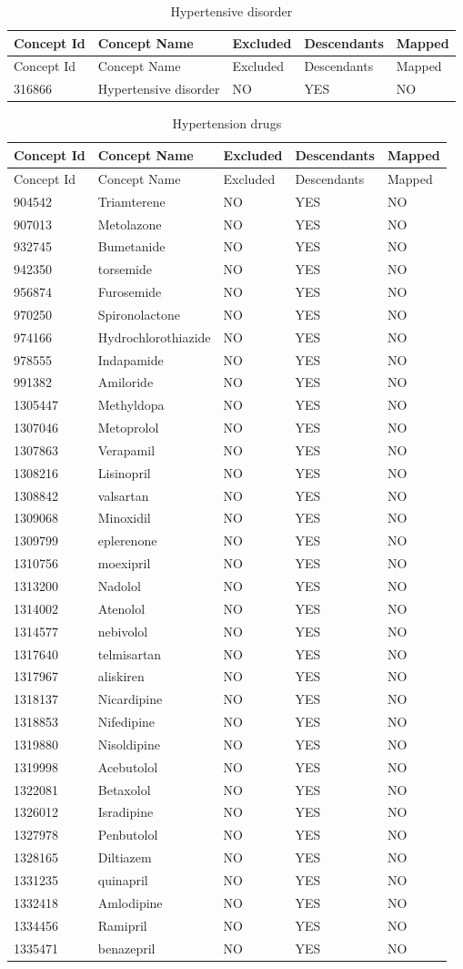 \documentclass[11pt]{book}
\theoremstyle{definition}
\theoremstyle{definition}
\theoremstyle{definition}
\theoremstyle{remark}
\begin{document}
\begin{longtable}[]{@{}lllll@{}}
\caption{\label{tab:hypertensionAceMono} Hypertensive
disorder}\tabularnewline
\toprule
Concept Id & Concept Name & Excluded & Descendants &
Mapped\tabularnewline
\midrule
\endfirsthead
\toprule
Concept Id & Concept Name & Excluded & Descendants &
Mapped\tabularnewline
\midrule
\endhead
316866 & Hypertensive disorder & NO & YES & NO\tabularnewline
\bottomrule
\end{longtable}

\begin{longtable}[]{@{}lllll@{}}
\caption{\label{tab:htnDrugsAceMono} Hypertension drugs}\tabularnewline
\toprule
Concept Id & Concept Name & Excluded & Descendants &
Mapped\tabularnewline
\midrule
\endfirsthead
\toprule
Concept Id & Concept Name & Excluded & Descendants &
Mapped\tabularnewline
\midrule
\endhead
904542 & Triamterene & NO & YES & NO\tabularnewline
907013 & Metolazone & NO & YES & NO\tabularnewline
932745 & Bumetanide & NO & YES & NO\tabularnewline
942350 & torsemide & NO & YES & NO\tabularnewline
956874 & Furosemide & NO & YES & NO\tabularnewline
970250 & Spironolactone & NO & YES & NO\tabularnewline
974166 & Hydrochlorothiazide & NO & YES & NO\tabularnewline
978555 & Indapamide & NO & YES & NO\tabularnewline
991382 & Amiloride & NO & YES & NO\tabularnewline
1305447 & Methyldopa & NO & YES & NO\tabularnewline
1307046 & Metoprolol & NO & YES & NO\tabularnewline
1307863 & Verapamil & NO & YES & NO\tabularnewline
1308216 & Lisinopril & NO & YES & NO\tabularnewline
1308842 & valsartan & NO & YES & NO\tabularnewline
1309068 & Minoxidil & NO & YES & NO\tabularnewline
1309799 & eplerenone & NO & YES & NO\tabularnewline
1310756 & moexipril & NO & YES & NO\tabularnewline
1313200 & Nadolol & NO & YES & NO\tabularnewline
1314002 & Atenolol & NO & YES & NO\tabularnewline
1314577 & nebivolol & NO & YES & NO\tabularnewline
1317640 & telmisartan & NO & YES & NO\tabularnewline
1317967 & aliskiren & NO & YES & NO\tabularnewline
1318137 & Nicardipine & NO & YES & NO\tabularnewline
1318853 & Nifedipine & NO & YES & NO\tabularnewline
1319880 & Nisoldipine & NO & YES & NO\tabularnewline
1319998 & Acebutolol & NO & YES & NO\tabularnewline
1322081 & Betaxolol & NO & YES & NO\tabularnewline
1326012 & Isradipine & NO & YES & NO\tabularnewline
1327978 & Penbutolol & NO & YES & NO\tabularnewline
1328165 & Diltiazem & NO & YES & NO\tabularnewline
1331235 & quinapril & NO & YES & NO\tabularnewline
1332418 & Amlodipine & NO & YES & NO\tabularnewline
1334456 & Ramipril & NO & YES & NO\tabularnewline
1335471 & benazepril & NO & YES & NO\tabularnewline

\end{longtable}
\end{document}
